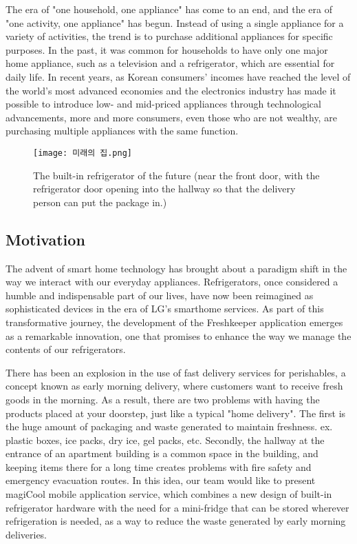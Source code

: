 \documentclass[conference]{IEEEtran}
\begin{document}
The era of "one household, one appliance" has come to an end, and the era of "one activity, one appliance" has begun. Instead of using a single appliance for a variety of activities, the trend is to purchase additional appliances for specific purposes. In the past, it was common for households to have only one major home appliance, such as a television and a refrigerator, which are essential for daily life. In recent years, as Korean consumers' incomes have reached the level of the world's most advanced economies and the electronics industry has made it possible to introduce low- and mid-priced appliances through technological advancements, more and more consumers, even those who are not wealthy, are purchasing multiple appliances with the same function.


\begin{figure}[h]
        \centerline{
            \texttt{[image: 미래의 집.png]}
        }
    \label{fig}
    \caption{The built-in refrigerator of the future (near the front door, with the refrigerator door opening into the hallway so that the delivery person can put the package in.)}
    \end{figure}
    
\subsection{Motivation}

The advent of smart home technology has brought about a paradigm shift in the way we interact with our everyday appliances. Refrigerators, once considered a humble and indispensable part of our lives, have now been reimagined as sophisticated devices in the era of LG's smarthome services. As part of this transformative journey, the development of the Freshkeeper application emerges as a remarkable innovation, one that promises to enhance the way we manage the contents of our refrigerators.

There has been an explosion in the use of fast delivery services for perishables, a concept known as early morning delivery, where customers want to receive fresh goods in the morning. As a result, there are two problems with having the products placed at your doorstep, just like a typical "home delivery". The first is the huge amount of packaging and waste generated to maintain freshness. ex. plastic boxes, ice packs, dry ice, gel packs, etc. Secondly, the hallway at the entrance of an apartment building is a common space in the building, and keeping items there for a long time creates problems with fire safety and emergency evacuation routes. 
In this idea, our team would like to present magiCool mobile application service, which combines a new design of built-in refrigerator hardware with the need for a mini-fridge that can be stored wherever refrigeration is needed, as a way to reduce the waste generated by early morning deliveries. 
\end{document}
